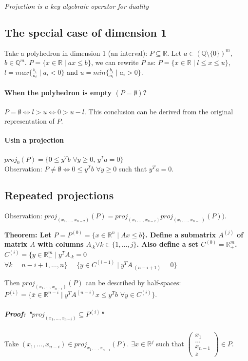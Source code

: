 \documentclass[main]{subfiles}
\begin{document}
\emph{Projection is a key algebraic operator for duality}

\subsection{The special case of dimension 1}
Take a polyhedron in dimension 1 (an interval): $P \subseteq \mathbb{R}$.
Let $a \in (\mathbb{Q}\setminus \{0\})^m$, $b \in \mathbb{Q}^m$. $P = \{ x \in
\mathbb{R} \mid ax \leq b \}$, we can rewrite $P$ as: $P = \{ x \in \mathbb{R}
\mid l \leq x \leq u \}$, $l = max \{ \frac{b_i}{a_i} \mid a_i < 0 \}$ and $u =
min \{ \frac{b_i}{a_i} \mid a_i > 0 \}$.

\paragraph{When the polyhedron is empty $(P = \emptyset)$?}
$P = \emptyset \iff l > u \iff 0 > u-l$. This conclusion can be derived from
the original representation of $P$.

\paragraph{Usin a projection}
$proj_{0}(P) = \{ 0 \leq y^T b$ $\forall y \geq 0$, $y^T a = 0 \}$ \\
Observation: $P \neq \emptyset \iff 0 \leq y^T b$ $\forall y \geq 0$ such that
$y^T a = 0$.

\subsection{Repeated projections}
Observation: $proj_{(x_1, \dots, x_{n-2})}(P) = proj_{(x_1, \dots, x_{n-2})}
proj_{(x_1, \dots, x_{n-1})}(P))$.

\textbf{Theorem: Let $P = P^{(0)} = \{ x \in \mathbb{R}^n \mid Ax \leq b \}$.
Define a submatrix $A^{(j)}$ of matrix $A$ with columns $A_{\cdot k} \forall k
\in \{1, \dots, j\}$. Also define a set $C^{(0)} = \mathbb{R}_+^m$. $C^{(i)} =
\{ y \in \mathbb{R}_+^m \mid y^T A_{\cdot k} = 0$ $\forall k = n-i+1, \dots, n
\} = \{y \in C^{(i-1)} \mid y^T A_{\cdot (n-i+1)} = 0\}$ }

Then $proj_{(x_1, \dots, x_{n-i})}(P)$ can be described by half-spaces:
$P^{(i)} = \{ \bar{x} \in \mathbb{R}^{n-i} \mid y^T A^{(n-i)}x \leq y^T b$
$\forall y \in C^{(i)} \}$.

\subparagraph{Proof: "$proj_{(x_1, \dots, x_{n-i})} \subseteq P^{(i)}$"}
Take $(x_1, \dots, x_{n-i}) \in proj_{x_1, \dots, x_{n-i}}(P).$ $\exists x \in
\mathbb{R}^j$ such that
$\begin{pmatrix}
	x_1 \\
    \dots \\
    x_{n-1} \\
    z
\end{pmatrix} \in P$.
\end{document}
